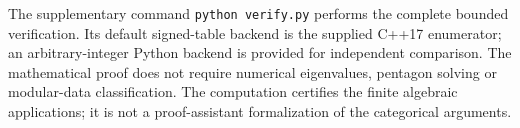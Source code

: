 The supplementary command \texttt{python verify.py} performs the complete
bounded verification. Its default signed-table backend is the supplied C++17 enumerator;
an arbitrary-integer Python backend is provided for independent comparison. The mathematical proof does
not require numerical eigenvalues, pentagon solving or modular-data
classification. The computation certifies the finite algebraic
applications; it is not a proof-assistant formalization of the categorical
arguments.
